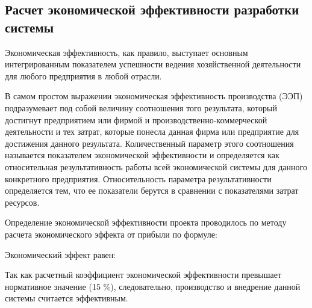 \subsection{Расчет экономической эффективности разработки системы}

Экономическая эффективность, как правило, выступает основным интегрированным показателем успешности ведения хозяйственной деятельности для любого предприятия в любой отрасли.

В самом простом выражении экономическая эффективность производства (ЭЭП) подразумевает под собой величину соотношения того результата, который достигнут предприятием или фирмой и производственно-коммерческой деятельности и тех затрат, которые понесла данная фирма или предприятие для достижения данного результата. Количественный параметр этого соотношения называется показателем экономической эффективности и определяется как относительная результативность работы всей экономической системы для данного конкретного предприятия. Относительность параметра результативности определяется тем, что ее показатели берутся в сравнении с показателями затрат ресурсов.

Определение экономической эффективности проекта проводилось по методу расчета экономического эффекта от прибыли по формуле:


Экономический эффект равен:


Так как расчетный коэффициент экономической эффективности превышает нормативное значение (15 \%), следовательно, производство и внедрение данной системы считается эффективным.
